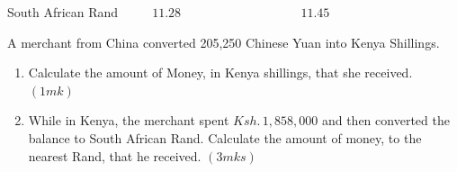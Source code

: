 \documentclass[
  a4paperpaper,
]{scrbook}
\begin{document}
\begin{tcolorbox}
South African Rand \(\hspace{1cm} 11.28 \hspace{4cm} 11.45\)

A merchant from China converted 205,250 Chinese Yuan into Kenya
Shillings.

\begin{enumerate}
\def\labelenumi{\alph{enumi})}
\item
  Calculate the amount of Money, in Kenya shillings, that she received.
  \hspace{2cm} \((1mk)\)
\item
  While in Kenya, the merchant spent \(Ksh.\, 1,858,000\) and then
  converted the balance to South African Rand. Calculate the amount of
  money, to the nearest Rand, that he received. \hspace{13.5cm}
  \((3mks)\)
\end{enumerate}


\end{tcolorbox}
\end{document}
